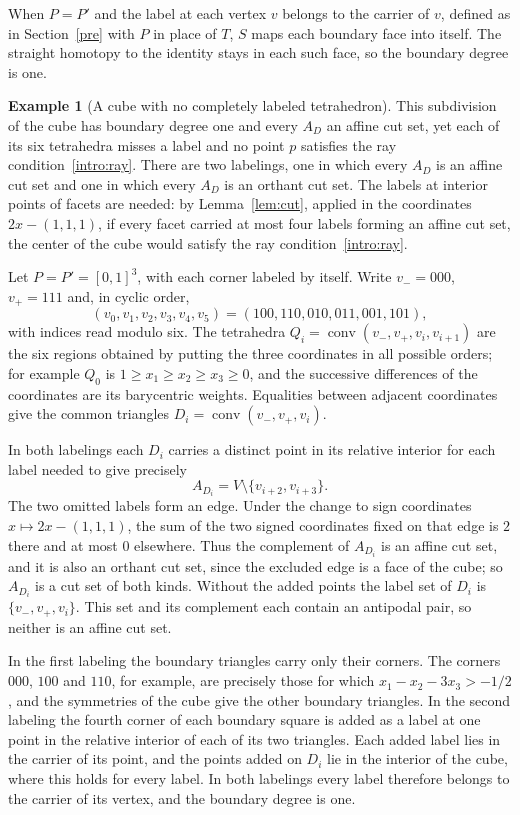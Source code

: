 \documentclass[11pt]{amsart}
\theoremstyle{definition}
\newtheorem{ex}[thm]{Example}
\theoremstyle{remark}
\numberwithin{equation}{section}
\DeclareMathOperator{\conv}{conv}
\begin{document}
When $P=P'$ and the label at each vertex $v$ belongs to the carrier of $v$, defined as in Section~\ref{pre} with $P$ in place of $T$, $S$ maps each boundary face into itself. The straight homotopy to the identity stays in each such face, so the boundary degree is one.

\begin{ex}[A cube with no completely labeled tetrahedron]\label{ex:sixtet}
This subdivision of the cube has boundary degree one and every $A_D$ an affine cut set, yet each of its six tetrahedra misses a label and no point $p$ satisfies the ray condition~\eqref{intro:ray}. There are two labelings, one in which every $A_D$ is an affine cut set and one in which every $A_D$ is an orthant cut set. The labels at interior points of facets are needed: by Lemma~\ref{lem:cut}, applied in the coordinates $2x-(1,1,1)$, if every facet carried at most four labels forming an affine cut set, the center of the cube would satisfy the ray condition~\eqref{intro:ray}.

Let $P=P'=[0,1]^3$, with each corner labeled by itself. Write $v_{-}=000$, $v_{+}=111$ and, in cyclic order,
\[
(v_0,v_1,v_2,v_3,v_4,v_5)=(100,110,010,011,001,101),
\]
with indices read modulo six. The tetrahedra $Q_i=\conv(v_{-},v_{+},v_i,v_{i+1})$ are the six regions obtained by putting the three coordinates in all possible orders; for example $Q_0$ is $1\ge x_1\ge x_2\ge x_3\ge0$, and the successive differences of the coordinates are its barycentric weights. Equalities between adjacent coordinates give the common triangles $D_i=\conv(v_{-},v_{+},v_i)$.

In both labelings each $D_i$ carries a distinct point in its relative interior for each label needed to give precisely
\[
                     A_{D_i}=V\setminus\{v_{i+2},v_{i+3}\}.
\]
The two omitted labels form an edge. Under the change to sign coordinates $x\mapsto2x-(1,1,1)$, the sum of the two signed coordinates fixed on that edge is $2$ there and at most $0$ elsewhere. Thus the complement of $A_{D_i}$ is an affine cut set, and it is also an orthant cut set, since the excluded edge is a face of the cube; so $A_{D_i}$ is a cut set of both kinds. Without the added points the label set of $D_i$ is $\{v_-,v_+,v_i\}$. This set and its complement each contain an antipodal pair, so neither is an affine cut set.

In the first labeling the boundary triangles carry only their corners. The corners $000$, $100$ and $110$, for example, are precisely those for which $x_1-x_2-3x_3>-1/2$, and the symmetries of the cube give the other boundary triangles. In the second labeling the fourth corner of each boundary square is added as a label at one point in the relative interior of each of its two triangles. Each added label lies in the carrier of its point, and the points added on $D_i$ lie in the interior of the cube, where this holds for every label. In both labelings every label therefore belongs to the carrier of its vertex, and the boundary degree is one.


\end{ex}
\end{document}
